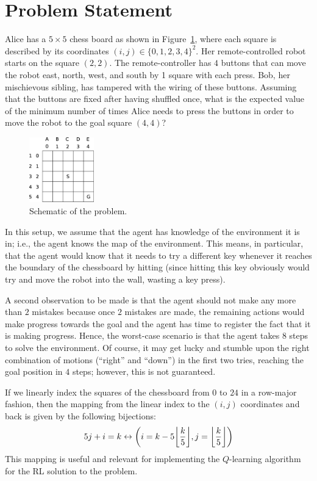 \section{Problem Statement}
\label{sec:problem}
%
Alice has a $5 \times 5$ chess board as shown in Figure~\ref{fig:problem}, where
each square is described by its coordinates $(i, j) \in \{0, 1, 2, 3, 4\}^2$.
Her remote-controlled robot starts on the square $(2,2)$. The remote-controller
has $4$ buttons that can move the robot east, north, west, and south by 1 square
with each press. Bob, her mischievous sibling, has tampered with the wiring of
these buttons. Assuming that the buttons are fixed after having shuffled once,
what is the expected value of the minimum number of times Alice needs to press
the buttons in order to move the robot to the goal square $(4,4)$?

\begin{figure}[bth]
    \centering
    \includegraphics[width=0.25\textwidth]{./figures/drawing_v1.eps}
    \caption{Schematic of the problem.}
    \label{fig:problem}
\end{figure}
%
In this setup, we assume that the agent has knowledge of the environment it is
in; i.e., the agent knows the map of the environment. This means, in particular,
that the agent would know that it needs to try a different key whenever it 
reaches the boundary of the chessboard by hitting (since hitting this key
obviously would try and move the robot into the wall, wasting a key press).

A second observation to be made is that the agent should not make any more
than $2$ mistakes because once $2$ mistakes are made, the remaining actions 
would make progress towards the goal and the agent has time to register the 
fact that it is making progress. Hence, the worst-case scenario is that the 
agent takes $8$ steps to solve the environment. Of course, it may get lucky and 
stumble upon the right combination of motions (``right'' and ``down'') in the 
first two tries, reaching the goal position in $4$ steps; however, this is not 
guaranteed.

If we linearly index the squares of the chessboard from $0$ to $24$ in a
row-major fashion, then the mapping from the linear index to the $(i, j)$
coordinates and back is given by the following bijections:
%
\begin{equation}
5j + i = k \leftrightarrow \left(i = k - 5 \floor*{\frac{k}{5}}, j = \floor*{\frac{k}{5}}\right) 
\label{eq:bijection}
\end{equation}
%
This mapping is useful and relevant for implementing the $Q$-learning algorithm
for the RL solution to the problem.